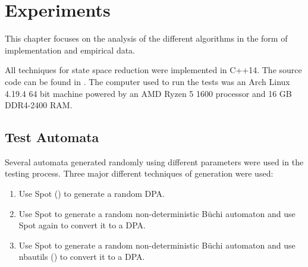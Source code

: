 \chapter{Experiments}

This chapter focuses on the analysis of the different algorithms in the form of implementation and empirical data.

All techniques for state space reduction were implemented in C++14. The source code can be found in \cite{}. The computer used to run the tests was an Arch Linux 4.19.4 64 bit machine powered by an AMD Ryzen 5 1600 processor and 16 GB DDR4-2400 RAM.




\section{Test Automata}
Several automata generated randomly using different parameters were used in the testing process. Three major different techniques of generation were used:

\begin{enumerate}
	\item Use Spot (\cite{}) to generate a random DPA.
	\item Use Spot to generate a random non-deterministic B\"uchi automaton and use Spot again to convert it to a DPA.
	\item Use Spot to generate a random non-deterministic B\"uchi automaton and use nbautils (\cite{}) to convert it to a DPA.
\end{enumerate}

